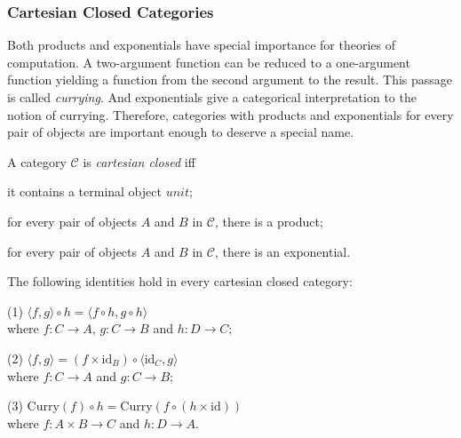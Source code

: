 \subsubsection{Cartesian Closed Categories}
\label{sec:bg_cat_ccc}
Both products and exponentials have special importance for theories of computation. A two-argument function can be reduced to a one-argument function yielding a function from the second argument to the result. This passage is called \emph{currying}. And exponentials give a categorical interpretation to the notion of currying. Therefore, categories with products and exponentials for every pair of objects are important enough to deserve a special name.

\begin{definition}
\label{definition:ccc}
A category $ \mathcal{C} $ is \emph{cartesian closed} iff
\begin{myitemize}
\item it contains a terminal object $ unit $;
\item for every pair of objects $ A $ and $ B $ in $ \mathcal{C} $, there is a product;
\item for every pair of objects $ A $ and $ B $ in $ \mathcal{C} $, there is an exponential.
\end{myitemize}
\end{definition}

\begin{proposition}
\label{proposition:eqns}
The following identities hold in every cartesian closed category:
\begin{myitemize}
\item[(1)] $ \langle f,g \rangle \circ h = \langle f \circ h , g \circ h \rangle $\\
where $ f: C \to A $, $ g: C \to B $ and $ h: D \to C $;
\item[(2)] $ \langle f,g \rangle = ( f \times \text{id}_B ) \circ \langle \text{id}_C , g \rangle $\\
where $ f: C \to A $ and $ g: C \to B $;
\item[(3)] $ \text{Curry}(f) \circ h = \text{Curry}(f \circ (h \times \text{id})) $\\
where $ f: A \times B \to C $ and $ h: D \to A $.
\end{myitemize}
\end{proposition}

